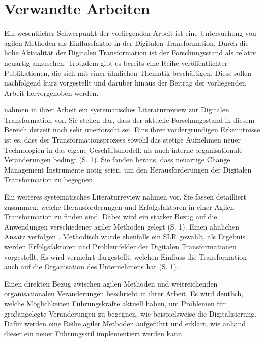 \chapter{Verwandte Arbeiten}
\label{relatedwork}


Ein wesentlicher Schwerpunkt der vorliegenden Arbeit ist eine  Untersuchung von agilen Methoden als Einflussfaktor in der Digitalen Transformation. Durch die hohe Aktualität der Digitalen Transformation ist der Forschungsstand als relativ neuartig anzusehen. Trotzdem gibt es bereits eine Reihe veröffentlichter Publikationen, die sich mit einer ähnlichen Thematik beschäftigen. Diese sollen nachfolgend kurz vorgestellt und darüber hinaus der Beitrag der vorliegenden Arbeit hervorgehoben werden.

 nahmen in ihrer Arbeit ein systematisches Literaturreview zur Digitalen Transformation vor. Sie stellen dar, dass der aktuelle Forschungsstand in diesem Bereich derzeit noch sehr unerforscht sei. Eins ihrer vordergründigen Erkenntnisse ist es, dass der Transformationsprozess sowohl das stetige Aufnehmen neuer Technologien in das eigene Geschäftsmodell, als auch interne organisationale Veränderungen bedingt (S. 1). Sie fanden heraus, dass neuartige Change Management Instrumente nötig seien, um den Herausforderungen der Digitalen Transformation zu begegnen.

Ein weiteres systematisches Literaturreview nahmen  vor. Sie fassen detailliert zusammen, welche Herausforderungen und Erfolgsfaktoren in einer Agilen Transformation zu finden sind. Dabei wird ein starker Bezug auf die Anwendungen verschiedener agiler Methoden gelegt (S. 1).  Einen ähnlichen Ansatz verfolgen . Methodisch wurde ebenfalls ein SLR gewählt, als Ergebnis werden Erfolgsfaktoren und Problemfelder der Digitalen Transformationen vorgestellt. Es wird vermehrt dargestellt, welchen Einfluss die Transformation auch auf die Organisation des Unternehmens hat (S. 1).

Einen direkten Bezug zwischen agilen Methoden und weitreichenden organisationalen Veränderungen beschriebt  in ihrer Arbeit. Es wird deutlich, welche Möglichkeiten Führungskräfte aktuell haben, um Problemen für großangelegte Veränderungen zu begegnen, wie beispielsweise die Digitalisierung. Dafür werden eine Reihe agiler Methoden aufgeführt und erklärt, wie anhand dieser ein neuer Führungsstil implementiert werden kann.

